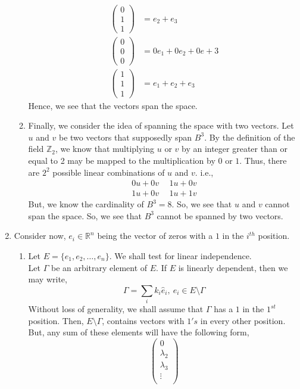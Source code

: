 \documentclass[letterpaper,10pt]{article}
\newcommand{\Z}{\mathbb{Z}}
\newcommand{\R}{\mathbb{R}}
\begin{document}
\begin{enumerate}
\begin{enumerate}
\begin{align*}
\begin{pmatrix}
0\\1\\1
\end{pmatrix} &= e_2+e_3\\
\begin{pmatrix}
0\\0\\0
\end{pmatrix} &= 0e_1+0e_2+0e+3\\
\begin{pmatrix}
1\\1\\1
\end{pmatrix} &= e_1+e_2+e_3
\end{align*}
Hence, we see that the vectors span the space.
\item Finally, we consider the idea of spanning the space with two vectors. Let $u$ and $v$ be two vectors that supposedly span $B^3$. By the definition of the field $\Z_2$, we know that multiplying $u$ or $v$ by an integer greater than or equal to 2 may be mapped to the multiplication by $0$ or $1$. Thus, there are $2^2$ possible linear combinations of $u$ and $v$. i.e.,
\begin{align*}
0u+0v\ &\ 1u+0v\\
1u+0v\ &\ 1u+1v
\end{align*}
But, we know the cardinality of $B^3=8$. So, we see that $u$ and $v$ cannot span the space. So, we see that $B^3$ cannot be spanned by two vectors.
\end{enumerate}
\item Consider now, $e_i\in \R^n$ being the vector of zeros with a $1$ in the $i^{th}$ position. 
\begin{enumerate}
\item Let $E=\{e_1,e_2,\ldots,e_n\}$. We shall test for linear independence.\\
Let $\Gamma$ be an arbitrary element of $E$. If $E$ is linearly dependent, then we may write,
\[\Gamma=\sum_i k_i\hat{e}_i,\ \hat{e}_i\in E\setminus \Gamma\]
Without loss of generality, we shall assume that $\Gamma$ has a $1$ in the $1^{st}$ position. Then, $E\setminus \Gamma$, contains vectors with $1's$ in every other position. But, any sum of these elements will have the following form,
\[\begin{pmatrix}
0\\
\lambda_2\\
\lambda_3\\
\vdots\\

\end{pmatrix}\]
\end{enumerate}
\end{enumerate}
\end{document}
